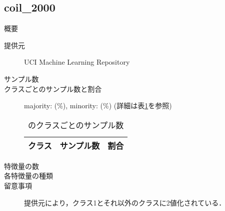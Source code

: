 \subsection{coil\_2000}
\begin{description}
    \item[概要] \cite{}
    \item[提供元] UCI Machine Learning Repository
    \item[サンプル数] 
    \item[クラスごとのサンプル数と割合] majority:  (\%), minority:  (\%) (詳細は表\ref{tab:}を参照)

        \begin{table}
            \centering
            \caption{のクラスごとのサンプル数}
            \label{tab:}
            \begin{tabular}{lrc} \hline
                \multicolumn{1}{c}{クラス}&
                \multicolumn{1}{c}{サンプル数}&
                \multicolumn{1}{c}{割合}\\
                \hline
                \hline

                \hline
            \end{tabular}
        \end{table}

    \item[特徴量の数] 
    \item[各特徴量の種類] \mbox{}
        
    \item[留意事項] 提供元により，クラス1とそれ以外のクラスに2値化されている．
\end{description}


